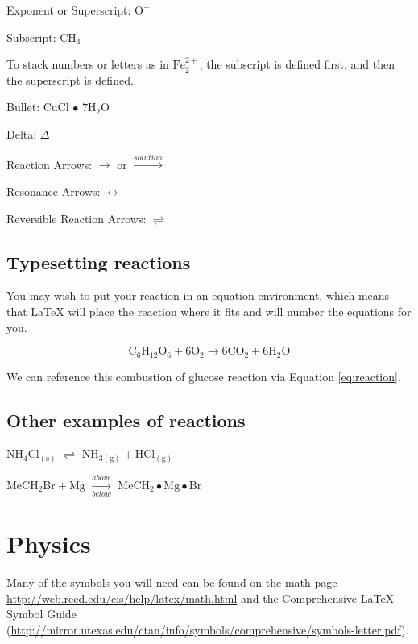 \documentclass[12pt,twoside]{reedthesis}
\theoremstyle{definition}
\theoremstyle{definition}
\theoremstyle{remark}
\begin{document}
  \noindent Exponent or Superscript: \(\mathrm{O^-}\)
  
  \noindent Subscript: \(\mathrm{CH_4}\)
  
  To stack numbers or letters as in \(\mathrm{Fe_2^{2+}}\), the subscript
  is defined first, and then the superscript is defined.
  
  \noindent Bullet: CuCl \(\bullet\) \(\mathrm{7H_{2}O}\)
  
  \noindent Delta: \(\Delta\)
  
  \noindent Reaction Arrows: \(\longrightarrow\) or
  \(\xrightarrow{solution}\)
  
  \noindent Resonance Arrows: \(\leftrightarrow\)
  
  \noindent Reversible Reaction Arrows: \(\rightleftharpoons\)
  
  \subsection{Typesetting reactions}\label{typesetting-reactions}
  
  You may wish to put your reaction in an equation environment, which
  means that LaTeX will place the reaction where it fits and will number
  the equations for you.
  
  \begin{equation}
    \mathrm{C_6H_{12}O_6  + 6O_2} \longrightarrow \mathrm{6CO_2 + 6H_2O}
    \label{eq:reaction}
  \end{equation}
  
  We can reference this combustion of glucose reaction via Equation
  \eqref{eq:reaction}.
  
  \subsection{Other examples of
  reactions}\label{other-examples-of-reactions}
  
  \(\mathrm{NH_4Cl_{(s)}}\) \(\rightleftharpoons\)
  \(\mathrm{NH_{3(g)}+HCl_{(g)}}\)
  
  \noindent \(\mathrm{MeCH_2Br + Mg}\) \(\xrightarrow[below]{above}\)
  \(\mathrm{MeCH_2\bullet Mg \bullet Br}\)
  
  \section{Physics}\label{physics}
  
  Many of the symbols you will need can be found on the math page
  \url{http://web.reed.edu/cis/help/latex/math.html} and the Comprehensive
  LaTeX Symbol Guide
  (\url{http://mirror.utexas.edu/ctan/info/symbols/comprehensive/symbols-letter.pdf}).
  
\end{document}
